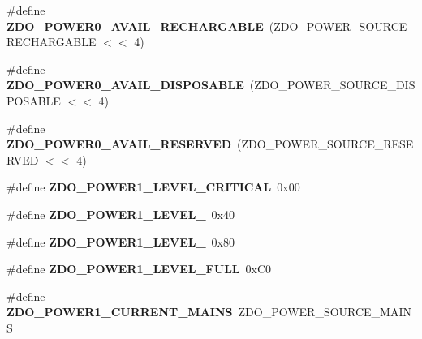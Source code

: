 \begin{DoxyCompactItemize}
\item 
\hypertarget{group__zdo_ga64a668e80cdcd48b1752e25fc2748568}{\#define {\bfseries Z\-D\-O\-\_\-\-P\-O\-W\-E\-R0\-\_\-\-A\-V\-A\-I\-L\-\_\-\-R\-E\-C\-H\-A\-R\-G\-A\-B\-L\-E}~(Z\-D\-O\-\_\-\-P\-O\-W\-E\-R\-\_\-\-S\-O\-U\-R\-C\-E\-\_\-\-R\-E\-C\-H\-A\-R\-G\-A\-B\-L\-E $<$$<$ 4)}\label{group__zdo_ga64a668e80cdcd48b1752e25fc2748568}

\item 
\hypertarget{group__zdo_ga803a168de8acadbcf958c156b50cefd5}{\#define {\bfseries Z\-D\-O\-\_\-\-P\-O\-W\-E\-R0\-\_\-\-A\-V\-A\-I\-L\-\_\-\-D\-I\-S\-P\-O\-S\-A\-B\-L\-E}~(Z\-D\-O\-\_\-\-P\-O\-W\-E\-R\-\_\-\-S\-O\-U\-R\-C\-E\-\_\-\-D\-I\-S\-P\-O\-S\-A\-B\-L\-E $<$$<$ 4)}\label{group__zdo_ga803a168de8acadbcf958c156b50cefd5}

\item 
\hypertarget{group__zdo_gaa2b0dc9387b2357aff027c868fdfb626}{\#define {\bfseries Z\-D\-O\-\_\-\-P\-O\-W\-E\-R0\-\_\-\-A\-V\-A\-I\-L\-\_\-\-R\-E\-S\-E\-R\-V\-E\-D}~(Z\-D\-O\-\_\-\-P\-O\-W\-E\-R\-\_\-\-S\-O\-U\-R\-C\-E\-\_\-\-R\-E\-S\-E\-R\-V\-E\-D $<$$<$ 4)}\label{group__zdo_gaa2b0dc9387b2357aff027c868fdfb626}

\item 
\hypertarget{group__zdo_ga499c77cd31be8a2eb08ffa396f6004aa}{\#define {\bfseries Z\-D\-O\-\_\-\-P\-O\-W\-E\-R1\-\_\-\-L\-E\-V\-E\-L\-\_\-\-C\-R\-I\-T\-I\-C\-A\-L}~0x00}\label{group__zdo_ga499c77cd31be8a2eb08ffa396f6004aa}

\item 
\hypertarget{group__zdo_ga916c88fc8989c52c38c84aa36f99effc}{\#define {\bfseries Z\-D\-O\-\_\-\-P\-O\-W\-E\-R1\-\_\-\-L\-E\-V\-E\-L\-\_}~0x40}\label{group__zdo_ga916c88fc8989c52c38c84aa36f99effc}

\item 
\hypertarget{group__zdo_gaad1b84fd581772392982c9c26cb0487a}{\#define {\bfseries Z\-D\-O\-\_\-\-P\-O\-W\-E\-R1\-\_\-\-L\-E\-V\-E\-L\-\_}~0x80}\label{group__zdo_gaad1b84fd581772392982c9c26cb0487a}

\item 
\hypertarget{group__zdo_ga64240a0e6567164403aea6ac65bdb691}{\#define {\bfseries Z\-D\-O\-\_\-\-P\-O\-W\-E\-R1\-\_\-\-L\-E\-V\-E\-L\-\_\-\-F\-U\-L\-L}~0x\-C0}\label{group__zdo_ga64240a0e6567164403aea6ac65bdb691}

\item 
\hypertarget{group__zdo_ga431fde766645c30139e485fbedd08fb9}{\#define {\bfseries Z\-D\-O\-\_\-\-P\-O\-W\-E\-R1\-\_\-\-C\-U\-R\-R\-E\-N\-T\-\_\-\-M\-A\-I\-N\-S}~Z\-D\-O\-\_\-\-P\-O\-W\-E\-R\-\_\-\-S\-O\-U\-R\-C\-E\-\_\-\-M\-A\-I\-N\-S}\label{group__zdo_ga431fde766645c30139e485fbedd08fb9}


\end{DoxyCompactItemize}

